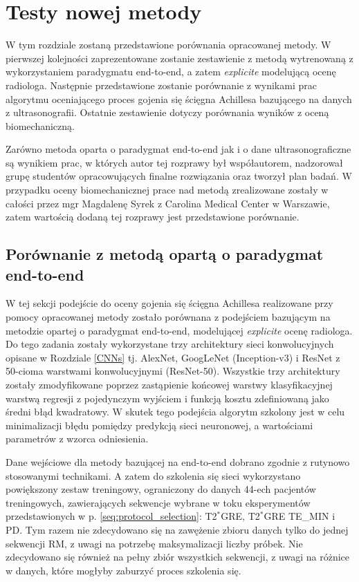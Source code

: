 \chapter{Testy nowej metody}

W tym rozdziale zostaną przedstawione porównania opracowanej metody. \linebreak W pierwszej kolejności zaprezentowane zostanie zestawienie z metodą wytrenowaną z wykorzystaniem paradygmatu end-to-end, a zatem \textit{explicite} modelującą ocenę radiologa. Następnie przedstawione zostanie porównanie z wynikami prac algorytmu oceniającego proces gojenia się ścięgna Achillesa bazującego na danych z ultrasonografii. Ostatnie zestawienie dotyczy porównania wyników z oceną biomechaniczną.

Zarówno metoda oparta o paradygmat end-to-end jak i o dane ultrasonograficzne są wynikiem prac, w których autor tej rozprawy był współautorem, nadzorował grupę studentów opracowujących finalne rozwiązania oraz tworzył plan badań. \linebreak W przypadku oceny biomechanicznej prace nad metodą zrealizowane zostały w całości przez mgr Magdalenę Syrek z Carolina Medical Center w Warszawie, zatem wartością dodaną tej rozprawy jest przedstawione porównanie.   

\section{Porównanie z metodą opartą o paradygmat end-to-end}
\label{seq:end-to-end}
W tej sekcji podejście do oceny gojenia się ścięgna Achillesa realizowane przy pomocy opracowanej metody zostało porównana z podejściem bazującym na metodzie opartej o paradygmat end-to-end, modelującej \textit{explicite} ocenę radiologa. \linebreak Do tego zadania zostały wykorzystane trzy architektury sieci konwolucyjnych opisane w Rozdziale \ref{CNNs} tj. AlexNet, GoogLeNet (Inception-v3) i ResNet z 50-cioma warstwami konwolucyjnymi (ResNet-50). Wszystkie trzy architektury zostały zmodyfikowane poprzez zastąpienie końcowej warstwy klasyfikacyjnej warstwą regresji \linebreak z pojedynczym wyjściem i funkcją kosztu zdefiniowaną jako średni błąd kwadratowy. W skutek tego podejścia algorytm szkolony jest w celu minimalizacji błędu pomiędzy predykcją sieci neuronowej, a wartościami parametrów z wzorca odniesienia. 

Dane wejściowe dla metody bazującej na end-to-end dobrano zgodnie z rutynowo stosowanymi technikami. A zatem do szkolenia się sieci wykorzystano powiększony zestaw treningowy, ograniczony do danych 44-ech pacjentów treningowych, zawierających sekwencje wybrane w toku eksperymentów przedstawionych w p. \ref{seq:protocol_selection}: T2$^\ast$GRE, T2$^\ast$GRE TE\_MIN i PD. Tym razem nie zdecydowano się na zawężenie zbioru danych tylko do jednej sekwencji RM, z uwagi na potrzebę maksymalizacji liczby próbek. Nie zdecydowano się również na pełny zbiór wszystkich sekwencji, \linebreak z uwagi na różnice w danych, które mogłyby zaburzyć proces szkolenia się. 

